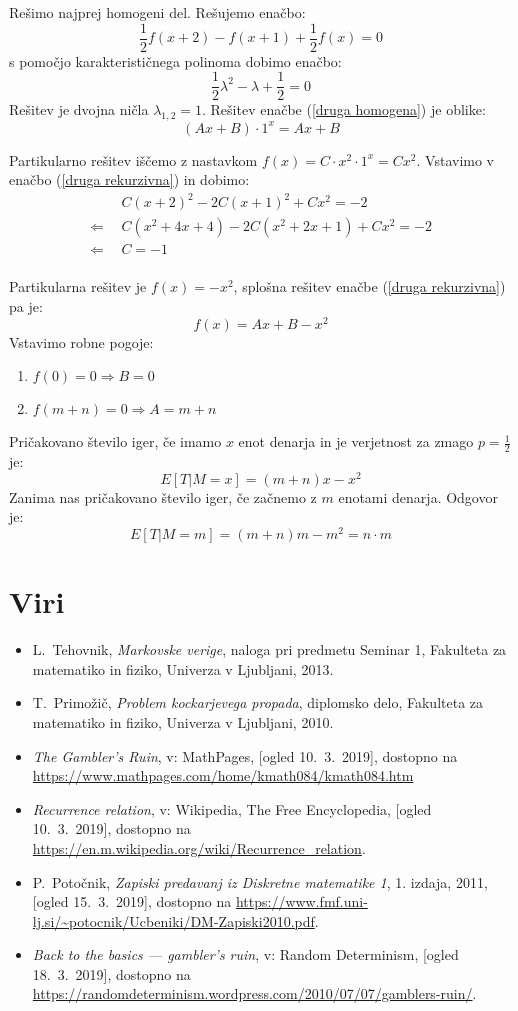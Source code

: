 \documentclass[12pt, a4paper]{article}
\begin{document}
Rešimo najprej homogeni del. Rešujemo enačbo: $$\frac{1}{2}f(x+2)-f(x+1)+\frac{1}{2}f(x)=0$$ s pomočjo karakterističnega polinoma dobimo enačbo: 
\begin{equation}
\label{druga homogena}
\frac{1}{2}\lambda^2-\lambda+\frac{1}{2}=0
\end{equation} 
Rešitev je dvojna ničla $\lambda_{1, 2}= 1$. Rešitev enačbe (\ref{druga homogena}) je oblike: $$(Ax+B)\cdot 1^x=Ax+B$$

Partikularno rešitev iščemo z nastavkom $f(x)=C\cdot x^2\cdot 1^x= Cx^2$. Vstavimo v enačbo (\ref{druga rekurzivna}) in dobimo:
\begin{equation*}
\begin{split}
 & ~~C(x+2)^2-2C(x+1)^2+Cx^2=-2\\
\Leftarrow & ~~C(x^2+4x+4)-2C(x^2+2x+1)+Cx^2=-2\\
\Leftarrow &  ~~C = -1 \\
\end{split}
\end{equation*}

Partikularna rešitev je $f(x)=-x^2$, splošna rešitev enačbe (\ref{druga rekurzivna}) pa je: $$f(x)=Ax+B-x^2$$
Vstavimo robne pogoje:
\begin{enumerate}
\item $f(0)=0\Rightarrow B = 0$
\item $f(m+n)=0 \Rightarrow A = m+n$
\end{enumerate}
Pričakovano število iger, če imamo $x$ enot denarja in je verjetnost za zmago $p=\frac{1}{2}$ je: $$E[T|M=x]= (m+n)x-x^2$$
Zanima nas pričakovano število iger, če začnemo z $m$ enotami denarja. Odgovor je:$$E[T|M=m]=(m+n)m-m^2= n\cdot m$$

\newpage

\section[Viri]{Viri}
\begin{itemize}
\item L.~Tehovnik, \emph{Markovske verige}, naloga pri predmetu Seminar 1, Fakulteta za matematiko in fiziko, Univerza v Ljubljani, 2013.
\item T.~Primožič, \emph{Problem kockarjevega propada}, diplomsko delo, Fakulteta za matematiko in fiziko, Univerza v Ljubljani, 2010.
\item \emph{The Gambler's Ruin}, v: MathPages, [ogled 10.~3.~2019], dostopno na \url{https://www.mathpages.com/home/kmath084/kmath084.htm}
\item \emph{Recurrence relation}, v: Wikipedia, The Free Encyclopedia, [ogled 10.~3.~2019], dostopno na \url{https://en.m.wikipedia.org/wiki/Recurrence_relation}.
\item P.~Potočnik, \emph{Zapiski predavanj iz Diskretne matematike 1}, 1. izdaja, 2011, [ogled 15.~3.~2019], dostopno na \url{https://www.fmf.uni-lj.si/~potocnik/Ucbeniki/DM-Zapiski2010.pdf}.
\item \emph{Back to the basics — gambler’s ruin}, v: Random Determinism, [ogled 18.~3.~2019], dostopno na \url{https://randomdeterminism.wordpress.com/2010/07/07/gamblers-ruin/}.
\end{itemize}
\end{document}
